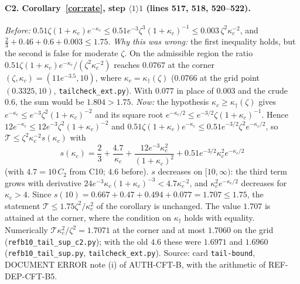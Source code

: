 \documentclass[11pt]{article}
\begin{document}
\paragraph{C2. Corollary~\ref{cor:rate}, step $\langle1\rangle1$ (lines 517, 518, 520--522).}
\emph{Before:} $0.51\zeta(1+\kappa_c)e^{-\kappa_c}\le0.51e^{-3}\zeta^3(1+\kappa_c)^{-1}
\le0.003\,\zeta^2\kappa_c^{-2}$, and $\frac23+0.46+0.6+0.003\le1.75$.
\emph{Why this was wrong:} the first inequality holds, but the second is false for moderate $\zeta$.
On the admissible region the ratio $0.51\zeta(1+\kappa_c)e^{-\kappa_c}/(\zeta^2\kappa_c^{-2})$
reaches $0.0767$ at the corner $(\zeta,\kappa_c)=(11e^{-3.5},10)$, where $\kappa_c=\kappa_\dagger(\zeta)$
($0.0766$ at the grid point $(0.3325,10)$, \texttt{tailcheck\_ext.py}).  With $0.077$ in place of
$0.003$ and the crude $0.6$, the sum would be $1.804>1.75$.
\emph{Now:} the hypothesis $\kappa_c\ge\kappa_\dagger(\zeta)$ gives
$e^{-\kappa_c}\le e^{-3}\zeta^2(1+\kappa_c)^{-2}$ and its square root
$e^{-\kappa_c/2}\le e^{-3/2}\zeta(1+\kappa_c)^{-1}$.  Hence
$12e^{-\kappa_c}\le12e^{-3}\zeta^2(1+\kappa_c)^{-2}$ and
$0.51\zeta(1+\kappa_c)e^{-\kappa_c}\le0.51e^{-3/2}\zeta^2e^{-\kappa_c/2}$, so
$\mathcal T\le\zeta^2\kappa_c^{-2}s(\kappa_c)$ with
\[
 s(\kappa_c)=\frac23+\frac{4.7}{\kappa_c}+\frac{12e^{-3}\kappa_c^2}{(1+\kappa_c)^2}
 +0.51e^{-3/2}\kappa_c^2e^{-\kappa_c/2}
\]
(with $4.7=10\,C_2$ from C10; $4.6$ before).  $s$ decreases on $[10,\infty)$: the third term grows
with derivative $24e^{-3}\kappa_c(1+\kappa_c)^{-3}<4.7\kappa_c^{-2}$, and $\kappa_c^2e^{-\kappa_c/2}$
decreases for $\kappa_c>4$.  Since $s(10)=0.667+0.47+0.494+0.077=1.707\le1.75$, the statement
$\mathcal T\le1.75\zeta^2/\kappa_c^2$ of the corollary is unchanged.  The value $1.707$ is attained
at the corner, where the condition on $\kappa_\dagger$ holds with equality.  Numerically
$\mathcal T\kappa_c^2/\zeta^2=1.7071$ at the corner and at most $1.7060$ on the grid
(\texttt{refb10\_tail\_sup\_c2.py}); with the old $4.6$ these were $1.6971$ and $1.6960$
(\texttt{refb10\_tail\_sup.py}, \texttt{tailcheck\_ext.py}).  Source: card \texttt{tail-bound},
DOCUMENT ERROR note (i) of AUTH-CFT-B, with the arithmetic of REF-DEP-CFT-B5.
\end{document}
